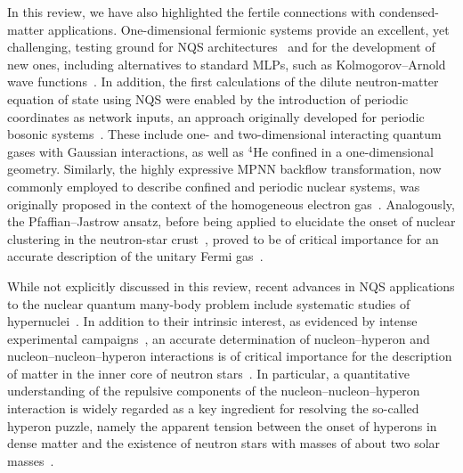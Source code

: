 In this review, we have also highlighted the fertile connections with condensed-matter applications. One-dimensional fermionic systems provide an excellent, yet challenging, testing ground for NQS architectures~\cite{keeble_machine_2023} and for the development of new ones, including alternatives to standard MLPs, such as Kolmogorov--Arnold wave functions~\cite{bedaque_machine_2024}. In addition, the first calculations of the dilute neutron-matter equation of state using NQS were enabled by the introduction of periodic coordinates as network inputs, an approach originally developed for periodic bosonic systems~\cite{pescia_neural-network_2022}. These include one- and two-dimensional interacting quantum gases with Gaussian interactions, as well as $^4$He confined in a one-dimensional geometry. Similarly, the highly expressive MPNN backflow transformation, now commonly employed to describe confined and periodic nuclear systems, was originally proposed in the context of the homogeneous electron gas~\cite{pescia_message-passing_2024}. Analogously, the Pfaffian--Jastrow ansatz, before being applied to elucidate the onset of nuclear clustering in the neutron-star crust~\cite{fore_investigating_2024}, proved to be of critical importance for an accurate description of the unitary Fermi gas~\cite{kim_neural-network_2024}.

While not explicitly discussed in this review, recent advances in NQS applications to the nuclear quantum many-body problem include systematic studies of hypernuclei~\cite{donna_hypernuclei_2025,zhang_machine_2025}. In addition to their intrinsic interest, as evidenced by intense experimental campaigns~\cite{hashimoto_spectroscopy_2006}, an accurate determination of nucleon--hyperon and nucleon--nucleon--hyperon interactions is of critical importance for the description of matter in the inner core of neutron stars~\cite{lonardoni_hyperon_2015}. In particular, a quantitative understanding of the repulsive components of the nucleon--nucleon--hyperon interaction is widely regarded as a key ingredient for resolving the so-called hyperon puzzle, namely the apparent tension between the onset of hyperons in dense matter and the existence of neutron stars with masses of about two solar masses~\cite{bombaci_hyperon_2017}.

